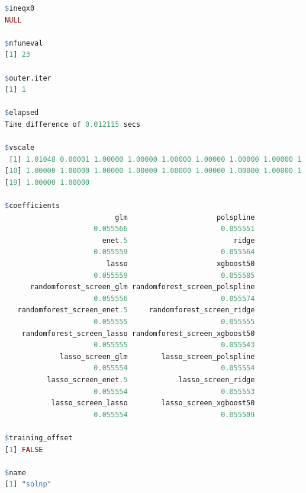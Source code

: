 \documentclass[12pt, krantz2,]{krantz}
\theoremstyle{definition}
\theoremstyle{definition}
\theoremstyle{definition}
\newcommand{\1}{\mathbbm{1}}
\begin{document}
\begin{lstlisting}[language=R]
$ineqx0
NULL

$nfuneval
[1] 23

$outer.iter
[1] 1

$elapsed
Time difference of 0.012115 secs

$vscale
 [1] 1.01048 0.00001 1.00000 1.00000 1.00000 1.00000 1.00000 1.00000 1.00000
[10] 1.00000 1.00000 1.00000 1.00000 1.00000 1.00000 1.00000 1.00000 1.00000
[19] 1.00000 1.00000

$coefficients
                          glm                     polspline 
                     0.055566                      0.055551 
                       enet.5                         ridge 
                     0.055559                      0.055564 
                        lasso                     xgboost50 
                     0.055559                      0.055585 
      randomforest_screen_glm randomforest_screen_polspline 
                     0.055556                      0.055574 
   randomforest_screen_enet.5     randomforest_screen_ridge 
                     0.055555                      0.055555 
    randomforest_screen_lasso randomforest_screen_xgboost50 
                     0.055555                      0.055543 
             lasso_screen_glm        lasso_screen_polspline 
                     0.055554                      0.055554 
          lasso_screen_enet.5            lasso_screen_ridge 
                     0.055554                      0.055553 
           lasso_screen_lasso        lasso_screen_xgboost50 
                     0.055554                      0.055509 

$training_offset
[1] FALSE

$name
[1] "solnp"


\end{lstlisting}
\end{document}
